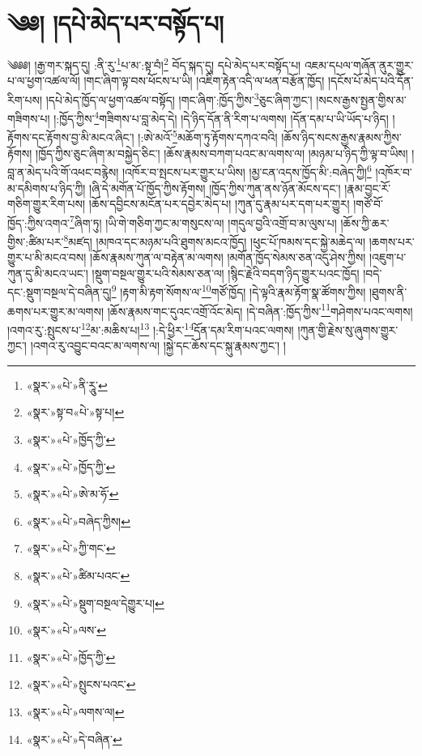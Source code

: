 \chapter{༄༅། །དཔེ་མེད་པར་བསྟོད་པ།}༄༅༅། །རྒྱ་གར་སྐད་དུ། :ནི་རུ་\footnote{«སྣར་»«པེ་»ནི་རཱུ་}པ་མ་:སྟ་བཾ།\footnote{«སྣར་»སྟ་བ«པེ་»སྟ་པ།} བོད་སྐད་དུ། དཔེ་མེད་པར་བསྟོད་པ། འཇམ་དཔལ་གཞོན་ནུར་གྱུར་པ་ལ་ཕྱག་འཚལ་ལོ། །གང་ཞིག་ལྟ་བས་ཕོངས་པ་ཡི། །འཇིག་རྟེན་འདི་ལ་ཕན་བརྩོན་ཁྱོད། །དངོས་པོ་མེད་པའི་དོན་རིག་པས། །དཔེ་མེད་ཁྱོད་ལ་ཕྱག་འཚལ་བསྟོད། །གང་ཞིག་:ཁྱོད་ཀྱིས་\footnote{«སྣར་»«པེ་»ཁྱོད་ཀྱི་}ཅུང་ཞིག་ཀྱང་། །སངས་རྒྱས་སྤྱན་གྱིས་མ་གཟིགས་པ། །:ཁྱོད་ཀྱིས་\footnote{«སྣར་»«པེ་»ཁྱོད་ཀྱི་}གཟིགས་པ་བླ་མེད་དེ། །དེ་ཉིད་དོན་ནི་རིག་པ་ལགས། །དོན་དམ་པ་ཡི་ཡོད་པ་ཉིད། །རྟོགས་དང་རྟོགས་བྱ་མི་མངའ་ཞིང་། །:ཨེ་མའོ་\footnote{«སྣར་»«པེ་»ཨེ་མ་ཧོ་}མཆོག་ཏུ་རྟོགས་དཀའ་བའི། །ཆོས་ཉིད་སངས་རྒྱས་རྣམས་ཀྱིས་རྟོགས། །ཁྱོད་ཀྱིས་ཅུང་ཞིག་མ་བསྐྱེད་ཅིང་། །ཆོས་རྣམས་བཀག་པའང་མ་ལགས་ལ། །མཉམ་པ་ཉིད་ཀྱི་ལྟ་བ་ཡིས། །བླ་ན་མེད་པའི་གོ་འཕང་བརྙེས། །འཁོར་བ་སྤངས་པར་གྱུར་པ་ཡིས། །མྱ་ངན་འདས་ཁྱོད་མི་:བཞེད་ཀྱི།\footnote{«སྣར་»«པེ་»བཞེད་ཀྱིས།} །འཁོར་བ་མ་དམིགས་པ་ཉིད་ཀྱི། །ཞི་དེ་མགོན་པོ་ཁྱོད་ཀྱིས་རྟོགས། །ཁྱོད་ཀྱིས་ཀུན་ནས་ཉོན་མོངས་དང་། །རྣམ་བྱང་རོ་གཅིག་གྱུར་རིག་པས། །ཆོས་དབྱིངས་མངོན་པར་དབྱེར་མེད་པ། །ཀུན་དུ་རྣམ་པར་དག་པར་གྱུར། །གཙོ་བོ་ཁྱོད་:ཀྱིས་འགའ་\footnote{«སྣར་»«པེ་»ཀྱི་གང་}ཞིག་ཏུ། །ཡི་གེ་གཅིག་ཀྱང་མ་གསུངས་ལ། །གདུལ་བྱའི་འགྲོ་བ་མ་ལུས་པ། །ཆོས་ཀྱི་ཆར་གྱིས་:ཚིམ་པར་\footnote{«སྣར་»«པེ་»ཚིམ་པའང་}མཛད། །མཁའ་དང་མཉམ་པའི་ཐུགས་མངའ་ཁྱོད། །ཕུང་པོ་ཁམས་དང་སྐྱེ་མཆེད་ལ། །ཆགས་པར་གྱུར་པ་མི་མངའ་བས། །ཆོས་རྣམས་ཀུན་ལ་བརྟེན་མ་ལགས། །མགོན་ཁྱོད་སེམས་ཅན་འདུ་ཤེས་ཀྱིས། །འཇུག་པ་ཀུན་དུ་མི་མངའ་ཡང་། །སྡུག་བསྔལ་གྱུར་པའི་སེམས་ཅན་ལ། །སྙིང་རྗེའི་བདག་ཉིད་གྱུར་པའང་ཁྱོད། །བདེ་དང་:སྡུག་བསྔལ་དེ་བཞིན་དུ།\footnote{«སྣར་»«པེ་»སྡུག་བསྔལ་དེགྱུར་པ།} །རྟག་མི་རྟག་སོགས་ལ་\footnote{«སྣར་»«པེ་»ལས་}གཙོ་ཁྱོད། །དེ་ལྟའི་རྣམ་རྟོག་སྣ་ཚོགས་ཀྱིས། །ཐུགས་ནི་ཆགས་པར་གྱུར་མ་ལགས། །ཆོས་རྣམས་གང་དུའང་འགྲོ་འོང་མེད། །དེ་བཞིན་:ཁྱོད་ཀྱིས་\footnote{«སྣར་»«པེ་»ཁྱོད་ཀྱི་}གཤེགས་པའང་ལགས། །འགའ་རུ་:སྤུངས་པ་\footnote{«སྣར་»«པེ་»སྤུངས་པའང་}མ་:མཆིས་པ།\footnote{«སྣར་»«པེ་»ལགས་ལ།} །:དེ་ཕྱིར་\footnote{«སྣར་»«པེ་»དེ་བཞིན་}དོན་དམ་རིག་པའང་ལགས། །ཀུན་གྱི་རྗེས་སུ་ཞུགས་གྱུར་ཀྱང་། །འགའ་རུ་འབྱུང་བའང་མ་ལགས་ལ། །སྐྱེ་དང་ཆོས་དང་སྐུ་རྣམས་ཀྱང་། །
